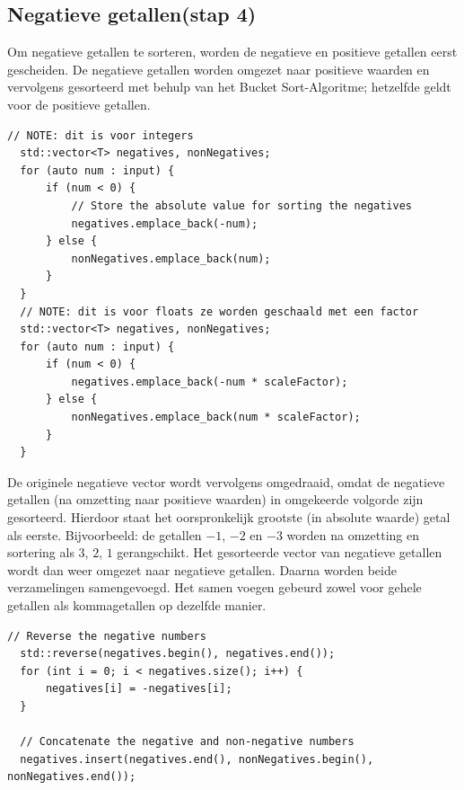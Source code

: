 \documentclass{article}
\begin{document}
\subsection{Negatieve getallen(stap 4)}
Om negatieve getallen te sorteren, worden de negatieve en positieve getallen eerst gescheiden.  
De negatieve getallen worden omgezet naar positieve waarden en vervolgens gesorteerd met behulp van het Bucket Sort-Algoritme; 
hetzelfde geldt voor de positieve getallen.
\newpage
\begin{lstlisting}[caption={Negatieve getallen}, label={lst:negatives}]
  // NOTE: dit is voor integers
  std::vector<T> negatives, nonNegatives;
  for (auto num : input) {
      if (num < 0) {
          // Store the absolute value for sorting the negatives
          negatives.emplace_back(-num);
      } else {
          nonNegatives.emplace_back(num);
      }
  }
  // NOTE: dit is voor floats ze worden geschaald met een factor
  std::vector<T> negatives, nonNegatives;
  for (auto num : input) {
      if (num < 0) {
          negatives.emplace_back(-num * scaleFactor);
      } else {
          nonNegatives.emplace_back(num * scaleFactor);
      }
  }
\end{lstlisting}

De originele negatieve vector wordt vervolgens omgedraaid, 
omdat de negatieve getallen (na omzetting naar positieve waarden) in omgekeerde volgorde zijn gesorteerd. 
Hierdoor staat het oorspronkelijk grootste (in absolute waarde) getal als eerste.  
Bijvoorbeeld: de getallen \(-1\), \(-2\) en \(-3\) worden na omzetting en sortering als \(3\), \(2\), \(1\) gerangschikt. 
Het gesorteerde vector van negatieve getallen wordt dan weer omgezet naar negatieve getallen.
Daarna worden beide verzamelingen samengevoegd. Het samen voegen gebeurd zowel voor gehele getallen als kommagetallen op dezelfde manier.
\begin{lstlisting}[caption={getallen samenvoegen}, label={lst:negatives}]
  // Reverse the negative numbers
  std::reverse(negatives.begin(), negatives.end());
  for (int i = 0; i < negatives.size(); i++) {
      negatives[i] = -negatives[i];
  }

  // Concatenate the negative and non-negative numbers
  negatives.insert(negatives.end(), nonNegatives.begin(), nonNegatives.end());
\end{lstlisting}
\end{document}
